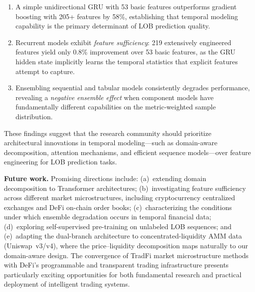 \documentclass[11pt,a4paper]{article}
\begin{document}
\begin{enumerate}[itemsep=0.2em]
    \item A simple unidirectional GRU with 53 basic features outperforms gradient boosting with 205+ features by 58\%, establishing that temporal modeling capability is the primary determinant of LOB prediction quality.

    \item Recurrent models exhibit \emph{feature sufficiency}: 219 extensively engineered features yield only 0.8\% improvement over 53 basic features, as the GRU hidden state implicitly learns the temporal statistics that explicit features attempt to capture.

    \item Ensembling sequential and tabular models consistently degrades performance, revealing a \emph{negative ensemble effect} when component models have fundamentally different capabilities on the metric-weighted sample distribution.
\end{enumerate}

These findings suggest that the research community should prioritize architectural innovations in temporal modeling---such as domain-aware decomposition, attention mechanisms, and efficient sequence models---over feature engineering for LOB prediction tasks.

\textbf{Future work.} Promising directions include: (a)~extending domain decomposition to Transformer architectures; (b)~investigating feature sufficiency across different market microstructures, including cryptocurrency centralized exchanges and DeFi on-chain order books; (c)~characterizing the conditions under which ensemble degradation occurs in temporal financial data; (d)~exploring self-supervised pre-training on unlabeled LOB sequences; and (e)~adapting the dual-branch architecture to concentrated-liquidity AMM data (Uniswap~v3/v4), where the price--liquidity decomposition maps naturally to our domain-aware design. The convergence of TradFi market microstructure methods with DeFi's programmable and transparent trading infrastructure presents particularly exciting opportunities for both fundamental research and practical deployment of intelligent trading systems.


\end{document}
